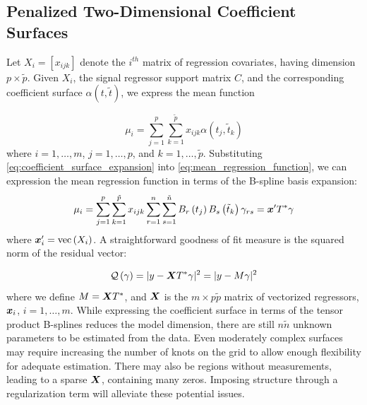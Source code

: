 \documentclass[12pt]{article}
\newcommand*\outlineskeleton{\color{green}}
\newcommand{\bfx}{\mbox{\boldmath $x$}}
\newcommand{\bfX}{\mbox{\boldmath $X$}}
\begin{document}
\subsection{{\outlineskeleton Penalized Two-Dimensional Coefficient Surfaces}}

Let $X_i = \left[x_{ijk}\right]$ denote the $i^{th}$ matrix of regression covariates, having dimension $p \times \tilde{p}$. Given $X_i$, the signal regressor support matrix $C$, and the corresponding coefficient surface $\alpha\left(t,\tilde{t}\right)$, we express the mean function 

\begin{equation} \label{eq:mean_regression_function}
\mu_i = \sum_{j=1}^p \sum_{k=1}^{\tilde{p}} x_{ijk} \alpha\left(t_j,\tilde{t}_k\right)
\end{equation} 
\noindent
where $i=1, \dots, m$, $j=1, \dots, p$, and $k=1,\dots,\tilde{p}$. Substituting \ref{eq:coefficient_surface_expansion} into \ref{eq:mean_regression_function}, we can expression the mean regression function in terms of the B-spline basis expansion:
\begin{equation} \label{eq:mean_regression_function_vec_notation}
\mu_i = \sum_{j=1}^p \sum_{k=1}^{\tilde{p}} x_{ijk}  \sum_{r=1}^n \sum_{s=1}^{\tilde{n}}  B_r\left(t_{j}\right) B_s\left(\tilde{t}_{k}\right) \gamma_{rs} = \bfx^\prime T^* \gamma
\end{equation} 
\noindent  
where $\bfx_i^\prime = \textup{vec}\left(X_i\right)$. A straightforward goodness of fit measure is the squared norm of the residual vector:

\begin{equation} 
\mathcal{Q}\left(\gamma\right) = \vert y - \bfX T^*\gamma \vert^2 = \vert y - M\gamma \vert^2  \label{eq:bivariate_resi_sum_of_squares}
\end{equation}
\noindent
where we define $M = \bfX T^*$, and $\bfX$ is the $m \times p\tilde{p}$ matrix of vectorized regressors, $\bfx_i$, $i=1,\dots,m$. While expressing the coefficient surface in terms of the tensor product B-splines reduces the model dimension, there are still $n\tilde{n}$ unknown parameters to be estimated from the data. Even moderately complex surfaces may require increasing the number of knots on the grid to allow enough flexibility for adequate estimation. There may also be regions without measurements, leading to a sparse $\bfX$, containing many zeros. Imposing structure through a regularization term will alleviate these potential issues.
\end{document}
